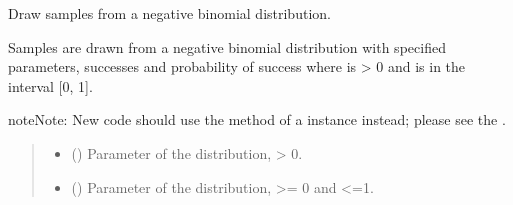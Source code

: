 \documentclass[letterpaper,10pt,english]{sphinxmanual}
\begin{document}
\begin{fulllineitems}
\label{\detokenize{metilda.controllers:metilda.controllers.pitch_art_wizard.negative_binomial}}
\pysigstartsignatures
{}
\pysigstopsignatures
\sphinxAtStartPar
Draw samples from a negative binomial distribution.

\sphinxAtStartPar
Samples are drawn from a negative binomial distribution with specified
parameters,  successes and  probability of success where 
is \textgreater{} 0 and  is in the interval {[}0, 1{]}.

\begin{sphinxadmonition}{note}{Note:}
\sphinxAtStartPar
New code should use the
method of a  instance instead;
please see the .
\end{sphinxadmonition}
\begin{quote}\begin{description}
\begin{itemize}
\item {} 
\sphinxAtStartPar
{} () \textendash{} Parameter of the distribution, \textgreater{} 0.

\item {} 
\sphinxAtStartPar
{} () \textendash{} Parameter of the distribution, \textgreater{}= 0 and \textless{}=1.


\end{itemize}
\end{description}
\end{quote}
\end{fulllineitems}
\end{document}

